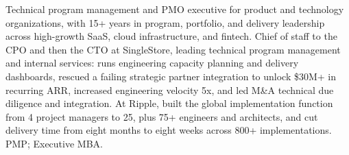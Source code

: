 \documentclass[11pt,letterpaper,sans]{moderncv}
\begin{document}
\makecvtitle


\vspace{6pt}
\small{Technical program management and PMO executive for product and technology organizations, with 15+ years in program, portfolio, and delivery leadership across high-growth SaaS, cloud infrastructure, and fintech. Chief of staff to the CPO and then the CTO at SingleStore, leading technical program management and internal services: runs engineering capacity planning and delivery dashboards, rescued a failing strategic partner integration to unlock \$30M+ in recurring ARR, increased engineering velocity 5x, and led M\&A technical due diligence and integration. At Ripple, built the global implementation function from 4 project managers to 25, plus 75+ engineers and architects, and cut delivery time from eight months to eight weeks across 800+ implementations. PMP; Executive MBA.}

\end{document}
